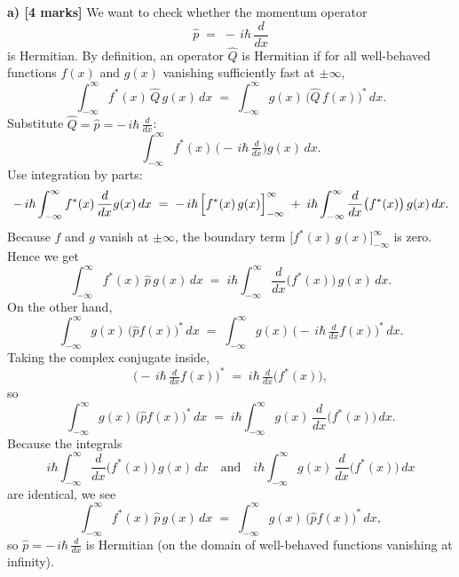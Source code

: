 \documentclass{article}
\begin{document}
\textbf{a) [4 marks]} 
We want to check whether the momentum operator 
\[
\hat{p} \;=\; -\,i\hbar\,\frac{d}{dx}
\]
is Hermitian. By definition, an operator $\hat{Q}$ is Hermitian if for all well-behaved functions $f(x)$ and $g(x)$ vanishing sufficiently fast at $\pm\infty$,
\[
\int_{-\infty}^{\infty} f^*(x)\,\hat{Q}\,g(x)\,dx \;=\; \int_{-\infty}^{\infty} g(x)\,\bigl(\hat{Q}\,f(x)\bigr)^*\,dx.
\]
Substitute $\hat{Q} = \hat{p} = -\,i\hbar\,\frac{d}{dx}$:
\[
\int_{-\infty}^{\infty} f^*(x)\,\bigl(-\,i\hbar\,\tfrac{d}{dx}\bigr) g(x)\,dx.
\]
Use integration by parts:
\[
-\,i\hbar \int_{-\infty}^{\infty} f^*(x)\,\frac{d}{dx}g(x)\,dx 
\;=\;
-\,i\hbar\,\Bigl[f^*(x)\,g(x)\Bigr]_{-\infty}^{\infty}
\;+\;
i\hbar \int_{-\infty}^{\infty} \frac{d}{dx}\bigl(f^*(x)\bigr)\,g(x)\,dx.
\]
Because $f$ and $g$ vanish at $\pm\infty$, the boundary term $\bigl[f^*(x)\,g(x)\bigr]_{-\infty}^{\infty}$ is zero. Hence we get
\[
\int_{-\infty}^{\infty} f^*(x)\,\hat{p}\,g(x)\,dx
\;=\;
i\hbar \int_{-\infty}^{\infty} \frac{d}{dx}\bigl(f^*(x)\bigr)\,g(x)\,dx.
\]
On the other hand,
\[
\int_{-\infty}^{\infty} g(x)\,\bigl(\hat{p} f(x)\bigr)^*\,dx
\;=\;
\int_{-\infty}^{\infty} g(x)\,\bigl(-\,i\hbar\,\tfrac{d}{dx}f(x)\bigr)^*\,dx.
\]
Taking the complex conjugate inside,
\[
\bigl(-\,i\hbar\,\tfrac{d}{dx}f(x)\bigr)^*
\;=\;
i\hbar\,\tfrac{d}{dx}\bigl(f^*(x)\bigr),
\]
so 
\[
\int_{-\infty}^{\infty} g(x)\,\bigl(\hat{p} f(x)\bigr)^*\,dx 
\;=\;
i\hbar \int_{-\infty}^{\infty} g(x)\,\frac{d}{dx}\bigl(f^*(x)\bigr)\,dx.
\]
Because the integrals 
\[
i\hbar \int_{-\infty}^{\infty} \frac{d}{dx}\bigl(f^*(x)\bigr)\,g(x)\,dx
\quad\text{and}\quad
i\hbar \int_{-\infty}^{\infty} g(x)\,\frac{d}{dx}\bigl(f^*(x)\bigr)\,dx
\]
are identical, we see 
\[
\int_{-\infty}^{\infty} f^*(x)\,\hat{p}\,g(x)\,dx
\;=\;
\int_{-\infty}^{\infty} g(x)\,\bigl(\hat{p} f(x)\bigr)^*\,dx,
\]
so $\hat{p} = -\,i\hbar\,\frac{d}{dx}$ is Hermitian (on the domain of well-behaved functions vanishing at infinity).
\end{document}
